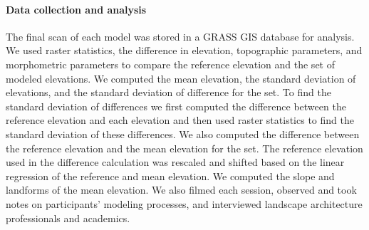 \documentclass[prodmode,acmtochi]{acmsmall} %
\begin{document}
\paragraph{Data collection and analysis}
The final scan of each model was stored in a GRASS GIS database for analysis. 
We used raster statistics, the difference in elevation, 
topographic parameters, and morphometric parameters
to compare the reference elevation and the set of modeled elevations. 
We computed 
the mean elevation,
the standard deviation of elevations, 
and the standard deviation of difference for the set.
To find the standard deviation of differences 
we first computed the difference between the reference elevation and each elevation 
and then used raster statistics to find the standard deviation of these differences.
We also computed the difference between the 
reference elevation and the mean elevation for the set. 
The reference elevation used in the difference calculation was rescaled and shifted based on the linear regression of the reference and mean elevation.
We computed the slope and landforms of the mean elevation. 
We also filmed each session, 
observed and took notes on participants' modeling processes, 
and interviewed landscape architecture professionals and academics.
\end{document}
